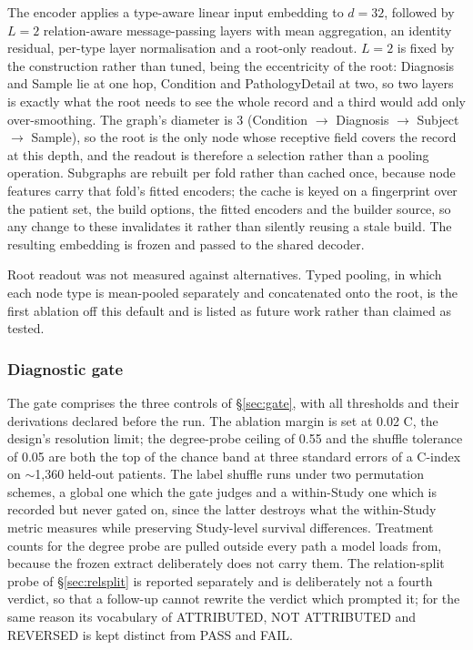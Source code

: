 The encoder applies a type-aware linear input embedding to $d = 32$, followed by $L = 2$ relation-aware message-passing layers \cite{schlichtkrull2018rgcn} with mean aggregation, an identity residual, per-type layer normalisation and a root-only readout. $L = 2$ is fixed by the construction rather than tuned, being the eccentricity of the root: Diagnosis and Sample lie at one hop, Condition and PathologyDetail at two, so two layers is exactly what the root needs to see the whole record and a third would add only over-smoothing. The graph's diameter is 3 (Condition $\rightarrow$ Diagnosis $\rightarrow$ Subject $\rightarrow$ Sample), so the root is the only node whose receptive field covers the record at this depth, and the readout is therefore a selection rather than a pooling operation. Subgraphs are rebuilt per fold rather than cached once, because node features carry that fold's fitted encoders; the cache is keyed on a fingerprint over the patient set, the build options, the fitted encoders and the builder source, so any change to these invalidates it rather than silently reusing a stale build. The resulting embedding is frozen and passed to the shared decoder.

Root readout was not measured against alternatives. Typed pooling, in which each node type is mean-pooled separately and concatenated onto the root, is the first ablation off this default and is listed as future work rather than claimed as tested.

\subsubsection{Diagnostic gate}

The gate comprises the three controls of \S\ref{sec:gate}, with all thresholds and their derivations declared before the run. The ablation margin is set at 0.02 C, the design's resolution limit; the degree-probe ceiling of 0.55 and the shuffle tolerance of 0.05 are both the top of the chance band at three standard errors of a C-index on $\sim$1,360 held-out patients. The label shuffle runs under two permutation schemes, a global one which the gate judges and a within-Study one which is recorded but never gated on, since the latter destroys what the within-Study metric measures while preserving Study-level survival differences. Treatment counts for the degree probe are pulled outside every path a model loads from, because the frozen extract deliberately does not carry them. The relation-split probe of \S\ref{sec:relsplit} is reported separately and is deliberately not a fourth verdict, so that a follow-up cannot rewrite the verdict which prompted it; for the same reason its vocabulary of ATTRIBUTED, NOT ATTRIBUTED and REVERSED is kept distinct from PASS and FAIL.

